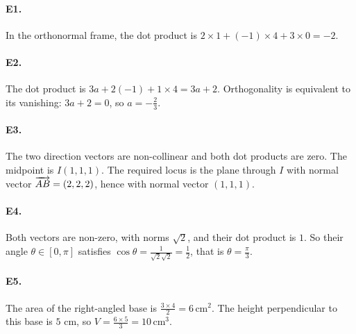 \paragraph{E1.}In the orthonormal frame, the dot product is $2\times1+(-1)\times4+3\times0=-2$.

\paragraph{E2.}The dot product is $3a+2(-1)+1\times4=3a+2$. Orthogonality is equivalent to its vanishing: $3a+2=0$, so $a=-\frac{2}{3}$.

\paragraph{E3.}The two direction vectors are non-collinear and both dot products are zero. The midpoint is $I(1,1,1)$. The required locus is the plane through $I$ with normal vector $\overrightarrow{AB}=(2,2,2)$, hence with normal vector $(1,1,1)$.

\paragraph{E4.}Both vectors are non-zero, with norms $\sqrt2$, and their dot product is $1$. So their angle $\theta\in[0,\pi]$ satisfies $\cos \theta=\frac{1}{\sqrt2\sqrt2}=\frac{1}{2}$, that is $\theta=\frac{\pi}{3}$.

\paragraph{E5.}The area of the right-angled base is $\frac{3\times4}{2}=6\,\mathrm{cm}^2$. The height perpendicular to this base is $5$ cm, so $V=\frac{6\times5}{3}=10\,\mathrm{cm}^3$.

